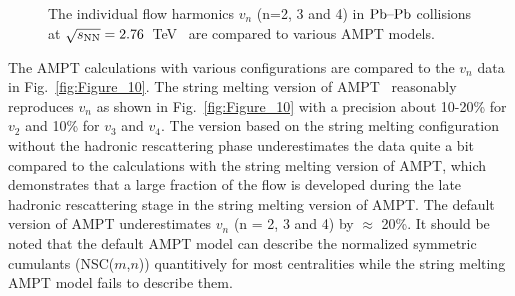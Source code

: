 \begin{figure}[h]
\begin{center}
        \caption{The individual flow harmonics $v_n$ (n=2, 3 and 4) in $\textnormal{Pb--Pb}$ collisions at $\sqrt{s_{\textnormal{NN}}}=2.76$~TeV~\cite{Adam:2016izf} are compared to various AMPT models.}
        \label{fig:Figure_A3}
              \end{center}
\end{figure}

The AMPT calculations with various configurations are compared to the $v_n$ data in Fig.~\ref{fig:Figure_10}.
The string melting version of AMPT~\cite{Lin:2001zk,Lin:2004en} reasonably reproduces $v_n$ as shown in Fig.~\ref{fig:Figure_10} with a precision about 10-20\% for $v_2$ and 10\% for $v_3$ and $v_4$. The version based on the string melting configuration without the hadronic rescattering phase underestimates the data quite a bit compared to the calculations with the string melting version of AMPT, which demonstrates that a large fraction of the flow is developed during the late hadronic rescattering stage in the string melting version of AMPT.
The default version of AMPT underestimates $v_n$ (n = 2, 3 and 4) by $\approx$ 20\%. It should be noted that the default AMPT model can describe the normalized symmetric cumulants (NSC($m$,$n$)) quantitively for most centralities while the string melting AMPT model fails to describe them.

